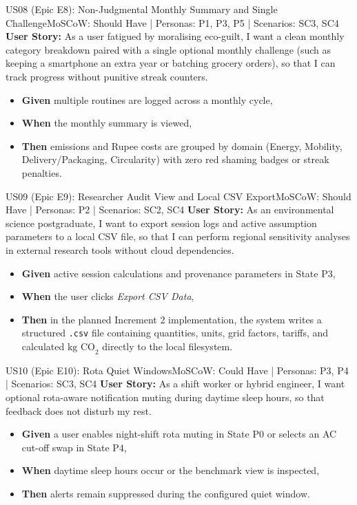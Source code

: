 \documentclass[12pt, a4paper]{article}
\begin{document}
\begin{storybox}{US08 (Epic E8): Non-Judgmental Monthly Summary and Single Challenge}{MoSCoW: Should Have | Personas: P1, P3, P5 | Scenarios: SC3, SC4}
\textbf{User Story:} As a user fatigued by moralising eco-guilt, I want a clean monthly category breakdown paired with a single optional monthly challenge (such as keeping a smartphone an extra year or batching grocery orders), so that I can track progress without punitive streak counters.
\begin{itemize}
    \item \textbf{Given} multiple routines are logged across a monthly cycle,
    \item \textbf{When} the monthly summary is viewed,
    \item \textbf{Then} emissions and Rupee costs are grouped by domain (Energy, Mobility, Delivery/Packaging, Circularity) with zero red shaming badges or streak penalties.
\end{itemize}
\end{storybox}

\begin{storybox}{US09 (Epic E9): Researcher Audit View and Local CSV Export}{MoSCoW: Should Have | Personas: P2 | Scenarios: SC2, SC4}
\textbf{User Story:} As an environmental science postgraduate, I want to export session logs and active assumption parameters to a local CSV file, so that I can perform regional sensitivity analyses in external research tools without cloud dependencies.
\begin{itemize}
    \item \textbf{Given} active session calculations and provenance parameters in State P3,
    \item \textbf{When} the user clicks \textit{Export CSV Data},
    \item \textbf{Then} in the planned Increment 2 implementation, the system writes a structured \texttt{.csv} file containing quantities, units, grid factors, tariffs, and calculated $\text{kg CO}_2$ directly to the local filesystem.
\end{itemize}
\end{storybox}

\begin{storybox}{US10 (Epic E10): Rota Quiet Windows}{MoSCoW: Could Have | Personas: P3, P4 | Scenarios: SC3, SC4}
\textbf{User Story:} As a shift worker or hybrid engineer, I want optional rota-aware notification muting during daytime sleep hours, so that feedback does not disturb my rest.
\begin{itemize}
    \item \textbf{Given} a user enables night-shift rota muting in State P0 or selects an AC cut-off swap in State P4,
    \item \textbf{When} daytime sleep hours occur or the benchmark view is inspected,
    \item \textbf{Then} alerts remain suppressed during the configured quiet window.
\end{itemize}
\end{storybox}
\end{document}
